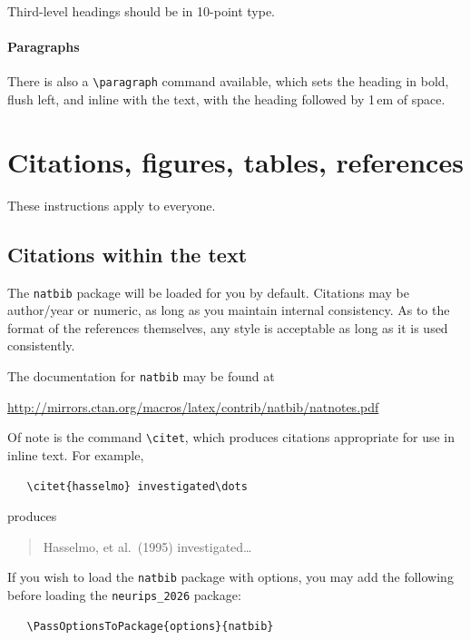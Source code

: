 \documentclass{article}
\begin{document}
Third-level headings should be in 10-point type.


\paragraph{Paragraphs}


There is also a \verb+\paragraph+ command available, which sets the heading in
bold, flush left, and inline with the text, with the heading followed by 1\,em
of space.


\section{Citations, figures, tables, references}
\label{others}


These instructions apply to everyone.


\subsection{Citations within the text}


The \verb+natbib+ package will be loaded for you by default.  Citations may be
author/year or numeric, as long as you maintain internal consistency.  As to the
format of the references themselves, any style is acceptable as long as it is
used consistently.


The documentation for \verb+natbib+ may be found at
\begin{center}
  \url{http://mirrors.ctan.org/macros/latex/contrib/natbib/natnotes.pdf}
\end{center}
Of note is the command \verb+\citet+, which produces citations appropriate for
use in inline text.  For example,
\begin{verbatim}
   \citet{hasselmo} investigated\dots
\end{verbatim}
produces
\begin{quote}
  Hasselmo, et al.\ (1995) investigated\dots
\end{quote}


If you wish to load the \verb+natbib+ package with options, you may add the
following before loading the \verb+neurips_2026+ package:
\begin{verbatim}
   \PassOptionsToPackage{options}{natbib}
\end{verbatim}
\end{document}
